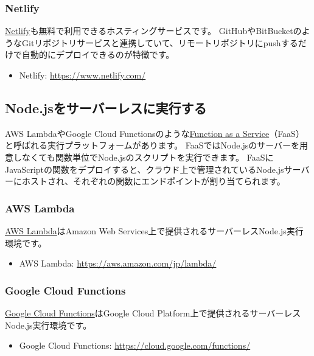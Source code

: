 \hypertarget{netlify}{%
\subsubsection{Netlify}\label{netlify}}

\href{https://www.netlify.com/}{Netlify}も無料で利用できるホスティングサービスです。
GitHubやBitBucketのようなGitリポジトリサービスと連携していて、リモートリポジトリにpushするだけで自動的にデプロイできるのが特徴です。
\begin{itemize}
\item Netlify: \url{https://www.netlify.com/}
\end{itemize}

\hypertarget{serverless}{%
\subsection{Node.jsをサーバーレスに実行する}\label{serverless}}

AWS LambdaやGoogle Cloud
Functionsのような\href{https://en.wikipedia.org/wiki/Function_as_a_service}{Function
as a Service}（FaaS）と呼ばれる実行プラットフォームがあります。
FaaSではNode.jsのサーバーを用意しなくても関数単位でNode.jsのスクリプトを実行できます。
FaaSにJavaScriptの関数をデプロイすると、クラウド上で管理されているNode.jsサーバーにホストされ、それぞれの関数にエンドポイントが割り当てられます。

\hypertarget{aws-lambda}{%
\subsubsection{AWS Lambda}\label{aws-lambda}}

\href{https://aws.amazon.com/jp/lambda/}{AWS Lambda}はAmazon Web
Services上で提供されるサーバーレスNode.js実行環境です。
\begin{itemize}
\item AWS Lambda: \url{https://aws.amazon.com/jp/lambda/}
\end{itemize}

\hypertarget{google-cloud-functions}{%
\subsubsection{Google Cloud Functions}\label{google-cloud-functions}}

\href{https://cloud.google.com/functions/}{Google Cloud
Functions}はGoogle Cloud
Platform上で提供されるサーバーレスNode.js実行環境です。
\begin{itemize}
\item Google Cloud Functions: \url{https://cloud.google.com/functions/}
\end{itemize}

